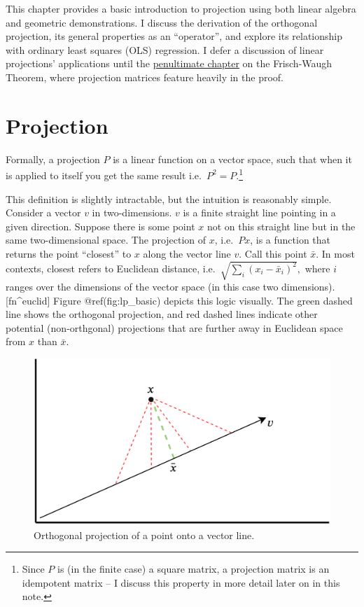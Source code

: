 \documentclass[
]{book}
\begin{document}
This chapter provides a basic introduction to projection using both linear algebra and geometric demonstrations. I discuss the derivation of the orthogonal projection, its general properties as an ``operator'', and explore its relationship with ordinary least squares (OLS) regression. I defer a discussion of linear projections' applications until the \protect\hyperlink{frisch}{penultimate chapter} on the Frisch-Waugh Theorem, where projection matrices feature heavily in the proof.

\hypertarget{proj_def}{%
\section{Projection}\label{proj_def}}

Formally, a projection \(P\) is a linear function on a vector space, such that when it is applied to itself you get the same result i.e.~\(P^2 = P\).\footnote{Since \(P\) is (in the finite case) a square matrix, a projection matrix is an idempotent matrix -- I discuss this property in more detail later on in this note.}

This definition is slightly intractable, but the intuition is reasonably simple. Consider a vector \(v\) in two-dimensions. \(v\) is a finite straight line pointing in a given direction. Suppose there is some point \(x\) not on this straight line but in the same two-dimensional space. The projection of \(x\), i.e.~\(Px\), is a function that returns the point ``closest'' to \(x\) along the vector line \(v\). Call this point \(\bar{x}\). In most contexts, closest refers to Euclidean distance, i.e.~\(\sqrt{\sum_{i} (x_i - \bar{x}_i)^2},\) where \(i\) ranges over the dimensions of the vector space (in this case two dimensions).{[}fn\^{}euclid{]} Figure @ref(fig:lp\_basic) depicts this logic visually. The green dashed line shows the orthogonal projection, and red dashed lines indicate other potential (non-orthgonal) projections that are further away in Euclidean space from \(x\) than \(\bar{x}\).

\begin{figure}
\includegraphics[width=1\linewidth]{images/lp_basic} \caption{Orthogonal projection of a point onto a vector line.}\label{fig:lp-basic}
\end{figure}
\end{document}
